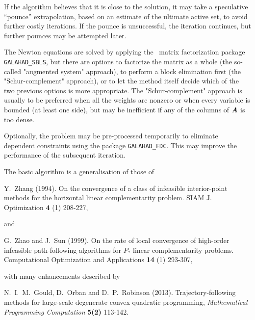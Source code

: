 \documentclass{galahad}
\begin{document}
If the algorithm believes that it is close to the solution, it may take a
speculative ``pounce'' extrapolation, based on an estimate of the ultimate 
active set, to avoid further costly iterations. If the pounce is unsuccessful, 
the iteration continues, but further pounces may be attempted later.

The Newton equations are solved  by applying the
\galahad\ matrix factorization package
{\tt GALAHAD\_SBLS}, but there are options
to factorize the matrix as a whole (the so-called "augmented system"
approach), to perform a block elimination first (the "Schur-complement"
approach), or to let the method itself decide which of the two
previous options is more appropriate.
The "Schur-complement" approach is usually to be preferred when all the
weights are nonzero or when every variable is bounded (at least one side),
but may be inefficient if any of the columns of ${\bm{A}}$ is too dense.

Optionally, the problem may be pre-processed temporarily to eliminate dependent
constraints using the package {\tt GALAHAD\_FDC}. This may improve the
performance of the subsequent iteration.

\vspace*{1mm}

\galreferences
\vspace*{1mm}

\noindent
The basic algorithm is a generalisation of those of
\vspace*{1mm}

\noindent
Y.\ Zhang (1994).
On the convergence of a class of infeasible interior-point methods for the
horizontal linear complementarity problem.
SIAM J. Optimization {\bf 4} (1) 208-227,
\vspace*{1mm}

\noindent
and

\noindent
G.\ Zhao and J.\ Sun (1999).
On the rate of local convergence of high-order
infeasible path-following algorithms for $P_*$ linear complementarity
problems.
Computational Optimization and Applications {\bf 14} (1) 293-307,
\vspace*{1mm}

\noindent
with many enhancements described by
\vspace*{1mm}

\noindent
N.\ I.\ M.\ Gould, D.\ Orban and D.\ P.\ Robinson (2013).
Trajectory-following methods for
large-scale  degenerate convex quadratic programming,
{\em Mathematical Programming Computation} {\bf 5(2)} 113-142.
\end{document}
